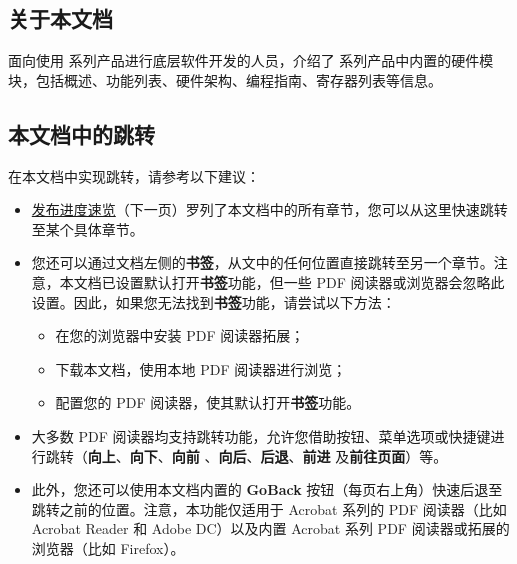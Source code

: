 \thispagestyle{empty}

\setcounter{page}{2}

\subsection*{关于本文档}


{\bfseries \chipname{}  }面向使用 \chipname{} 系列产品进行底层软件开发的人员，介绍了 \chipname{} 系列产品中内置的硬件模块，包括概述、功能列表、硬件架构、编程指南、寄存器列表等信息。

\subsection*{本文档中的跳转}
在本文档中实现跳转，请参考以下建议：
\begin{itemize}
    \item \hyperref[tab:release-status]{发布进度速览}（下一页）罗列了本文档中的所有章节，您可以从这里快速跳转至某个具体章节。
    \item 您还可以通过文档左侧的\textbf{书签}，从文中的任何位置直接跳转至另一个章节。注意，本文档已设置默认打开\textbf{书签}功能，但一些 PDF 阅读器或浏览器会忽略此设置。因此，如果您无法找到\textbf{书签}功能，请尝试以下方法：
    \begin{itemize}
        \item 在您的浏览器中安装 PDF 阅读器拓展；
        \item 下载本文档，使用本地 PDF 阅读器进行浏览；
        \item 配置您的 PDF 阅读器，使其默认打开\textbf{书签}功能。
    \end{itemize}
    \item 大多数 PDF 阅读器均支持跳转功能，允许您借助按钮、菜单选项或快捷键进行跳转（\textbf{向上}、\textbf{向下}、\textbf{向前}
    、\textbf{向后}、\textbf{后退}、\textbf{前进}
    及\textbf{前往页面}）等。
    \item 此外，您还可以使用本文档内置的 \textbf{GoBack} 按钮（每页右上角）快速后退至跳转之前的位置。注意，本功能仅适用于 Acrobat 系列的 PDF 阅读器（比如 Acrobat Reader 和 Adobe DC）以及内置 Acrobat 系列 PDF 阅读器或拓展的浏览器（比如 Firefox）。
\end{itemize}
